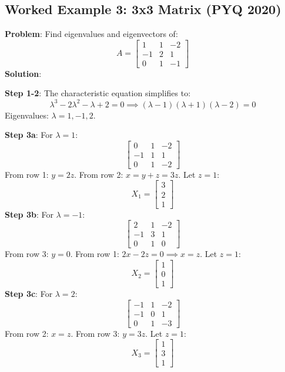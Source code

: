 \documentclass[
]{article}
\begin{document}
\subsection{Worked Example 3: 3x3 Matrix (PYQ
2020)}\label{worked-example-3-3x3-matrix-pyq-2020}

\textbf{Problem}: Find eigenvalues and eigenvectors of:
\[
A =
\begin{bmatrix}
1 & 1 & -2 \\
-1 & 2 & 1 \\
0 & 1 & -1
\end{bmatrix}
\]
\textbf{Solution}:

\textbf{Step 1-2}: The characteristic equation simplifies to:
\[
\lambda^3 - 2\lambda^2 - \lambda + 2 = 0 \implies (\lambda - 1)(\lambda + 1)(\lambda - 2) = 0
\]
Eigenvalues: \(\lambda = 1, -1, 2\).

\textbf{Step 3a}: For \(\lambda = 1\):
\[
\begin{bmatrix}
0 & 1 & -2 \\
-1 & 1 & 1 \\
0 & 1 & -2
\end{bmatrix}
\]
From row 1: \(y = 2z\). From row 2: \(x = y + z = 3z\). Let \(z = 1\):
\[
X_1 =
\begin{bmatrix}
3 \\
2 \\
1
\end{bmatrix}
\]
\textbf{Step 3b}: For \(\lambda = -1\):
\[
\begin{bmatrix}
2 & 1 & -2 \\
-1 & 3 & 1 \\
0 & 1 & 0
\end{bmatrix}
\]
From row 3: \(y = 0\). From row 1: \(2x - 2z = 0 \implies x = z\). Let
\(z = 1\):
\[
X_2 =
\begin{bmatrix}
1 \\
0 \\
1
\end{bmatrix}
\]
\textbf{Step 3c}: For \(\lambda = 2\):
\[
\begin{bmatrix}
-1 & 1 & -2 \\
-1 & 0 & 1 \\
0 & 1 & -3
\end{bmatrix}
\]
From row 2: \(x = z\). From row 3: \(y = 3z\). Let \(z = 1\):
\[
X_3 =
\begin{bmatrix}
1 \\
3 \\
1
\end{bmatrix}
\]
\end{document}

